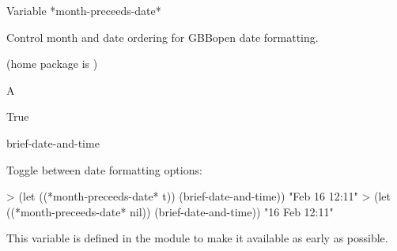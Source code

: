 \documentclass[10pt,twoside,english,pdftex]{article}
\begin{document}

\begin{functiondoc}{Variable}%
{*month-preceeds-date*}{}%

\fnsyntax

\fnpurpose Control month and date ordering for GBBopen date formatting.

\fnpackage {} (home package is )

\fnmodule {}

\fnvaluetype A 

\fninitialvalue True

\begin{alsos}{brief-date-and-time}
\end{alsos}

\fnexamples
Toggle between date formatting options:
\begin{example}
> (let ((*month-preceeds-date* t))
    (brief-date-and-time))
"Feb 16 12:11"
> (let ((*month-preceeds-date* nil))
    (brief-date-and-time))
"16 Feb 12:11"
\end{example}

\fnnotes
{}%
%
This variable is defined in the  module to make it
available as early as possible.

\end{functiondoc}

\end{document}
